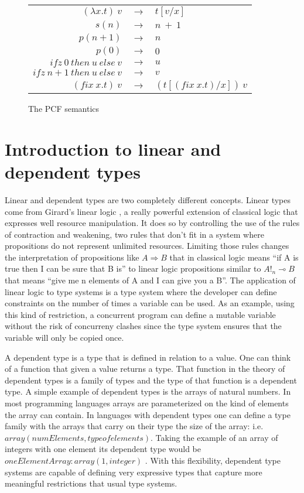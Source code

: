 \documentclass[a4paper,12pt]{article}
\begin{document}
\begin{figure}[ht]
  \begin{center}
    \begin{tabular}{r c l}
      $(\lambda x.t)~v$ & $\rightarrow$ & $t[v/x]$ \\
      $s(n)$ & $\rightarrow$ & $ n~+~1$ \\
      $p(n+1)$ & $\rightarrow$ & $ n$ \\
      $p(0)$ & $\rightarrow$ & $0$ \\
      $ifz~0~then~u~else~v$ & $\rightarrow$ & $u$ \\
      $ifz~n+1~then~u~else~v$ & $\rightarrow$ & $v$ \\
      $(fix~x.t)~v$ & $\rightarrow$ & $(t[(fix~x.t)/x])~v$
    \end{tabular}
  \end{center}
  \caption{The PCF semantics}
  \label{pcf-sem}
\end{figure}


\section{Introduction to linear and dependent types}

Linear and dependent types are two completely different
concepts. Linear types come from Girard's linear logic
\cite{girard1987linear}, a really powerful extension of classical logic
that expresses well resource manipulation. It does so by controlling
the use of the rules of contraction and weakening, two rules that
don't fit in a system where propositions do not represent unlimited
resources. Limiting those rules changes the interpretation of
propositions like $A \Rightarrow B$ that in classical logic means
``if A is true then I can be sure that B is'' to linear logic
propositions similar to $A!_n \multimap B$ that means ``give me n
elements of A and I can give you a B''. The application of linear logic to type
systems is a type system where the developer can define constraints on the
number of times a variable can be used. As an example, using this kind of
restriction, a concurrent program can define a mutable variable without
the risk of concurreny clashes since the type system ensures that the variable
will only be copied once.

A dependent type is a type that is defined in relation to a value. One can think
of a function that given a value returns a type. That function in the theory of
dependent types is a family of types and the type of that function is a
dependent type. A simple example of dependent types is the arrays of natural
numbers. In most programming languages arrays are parameterized on the kind
of elements the array can contain. In languages with dependent types one can
define a type family with the arrays that carry on their type the size of the
array: i.e. $array(numElements, typeofelements)$. Taking the example of an array of
integers with one element its dependent type would be $oneElementArray:array(1,
integer)$ . With this flexibility, dependent type systems are capable of defining
very expressive types that capture more meaningful restrictions that usual type
systems.
\end{document}
